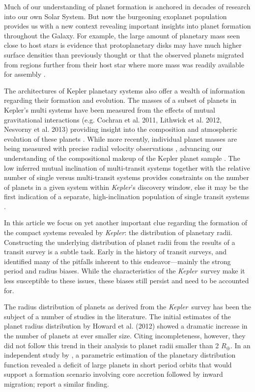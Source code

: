 \documentclass[iop]{emulateapj}
\def\Kepler{\textit{Kepler}}
\def\Rearth{R_\oplus}
\begin{document}
Much of our understanding of planet formation is anchored in decades
of research into our own Solar System.  But now the burgeoning exoplanet 
population provides us with a new context revealing important insights
into planet formation throughout the Galaxy. For example, the large amount of planetary mass seen close to host stars 
is evidence that protoplanetary disks may have much higher surface
densities than previously thought \citep{hansen2012,chiang2012} or that the observed planets migrated
from regions further from their host star where more mass was readily
available for assembly \citep{swift2013,raymond2014}.

The architectures of Kepler planetary systems also offer a wealth of information regarding their formation and evolution.  The masses of a subset of planets in Kepler's multi systems have been measured from the effects of mutual gravitational interactions (e.g. Cochran et al. 2011, Lithwick et al. 2012, Nesvorny et al. 2013) providing insight into the composition and atmospheric evolution of these planets \citep{wu2013,owen2013,lopez2012}.  While more recently, individual planet masses are being measured with precise radial velocity observations \citep{marcy2014},  advancing our understanding of the compositional makeup of the Kepler planet sample \citep[e.g.,][]{weiss2014}.  The low inferred mutual inclination of multi-transit systems \citep[$\sim 1^\circ$--$3^\circ$;][]{fabrycky2012b,fang2012}
together with the relative number of single versus multi-transit systems provides constraints
on the number of planets in a given system within \Kepler's discovery
window, else it may be the first indication of a separate,
high-inclination population of single transit systems \citep{hansen2013,fang2012}.




In this article we focus on yet another important clue regarding the
formation of the compact systems revealed by \Kepler: the
distribution of planetary radii.  Constructing the underlying distribution of planet radii from the results of a transit survey is a subtle task.  Early in the history of transit surveys, \citet{gaudi2005} and \citet{gaudietal2005} identified many of the pitfalls inherent to this endeavor---mainly the strong period and radius biases.  While the characteristics of the \Kepler\ survey make it less susceptible to these issues, these biases still persist and need to be accounted for.  

The radius distribution of planets as derived from the \Kepler\ survey has been the subject of a number of studies in the literature.  The initial estimates of the planet
radius distribution by Howard et al. (2012) showed a dramatic increase
in the number of planets at ever smaller size. Citing incompleteness, however, 
they did not follow this trend in their analysis to planet radii smaller
than 2 $\Rearth$. In an independent study by \citet{youdin2011}, a
parametric estimation of the planetary distribution function revealed a deficit of large planets in short period orbits that would support a formation scenario involving core accretion followed by inward migration; \citet{dong2012} report a similar finding.
\end{document}
